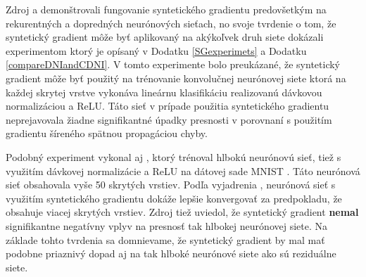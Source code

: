 Zdroj \cite{Jaderberg2016} a \cite{Czarnecki2017} demonštrovali fungovanie syntetického gradientu predovšetkým na rekurentných a dopredných neurónových sieťach, no svoje tvrdenie o tom, že syntetický gradient môže byť aplikovaný na akýkoľvek druh siete dokázali experimentom ktorý je opísaný v Dodatku \ref{SGexperimets} a Dodatku \ref{compareDNIandCDNI}. V tomto experimente bolo preukázané, že syntetický gradient môže byť použitý na trénovanie konvolučnej neurónovej siete ktorá na každej skrytej vrstve vykonáva lineárnu klasifikáciu realizovanú dávkovou normalizáciou a ReLU. Táto sieť v prípade použitia syntetického gradientu neprejavovala žiadne signifikantné úpadky presnosti v porovnaní s použitím gradientu šíreného spätnou propagáciou chyby.

Podobný experiment vykonal aj \cite{Czarnecki2017}, ktorý trénoval hlbokú neurónovú sieť, tiež s využitím dávkovej normalizácie a ReLU na dátovej sade MNIST \cite{yann1998mnist}. Táto neurónová sieť obsahovala vyše 50 skrytých vrstiev. Podľa vyjadrenia \cite{Czarnecki2017}, neurónová sieť s využitím syntetického gradientu dokáže lepšie konvergovať za predpokladu, že obsahuje viacej skrytých vrstiev. Zdroj \cite{Czarnecki2017} tiež uviedol, že syntetický gradient \textbf{nemal} signifikantne negatívny vplyv na presnosť tak hlbokej neurónovej siete. Na základe tohto tvrdenia sa domnievame, že syntetický gradient by mal mať podobne priaznivý dopad aj na tak hlboké neurónové siete ako sú reziduálne siete.